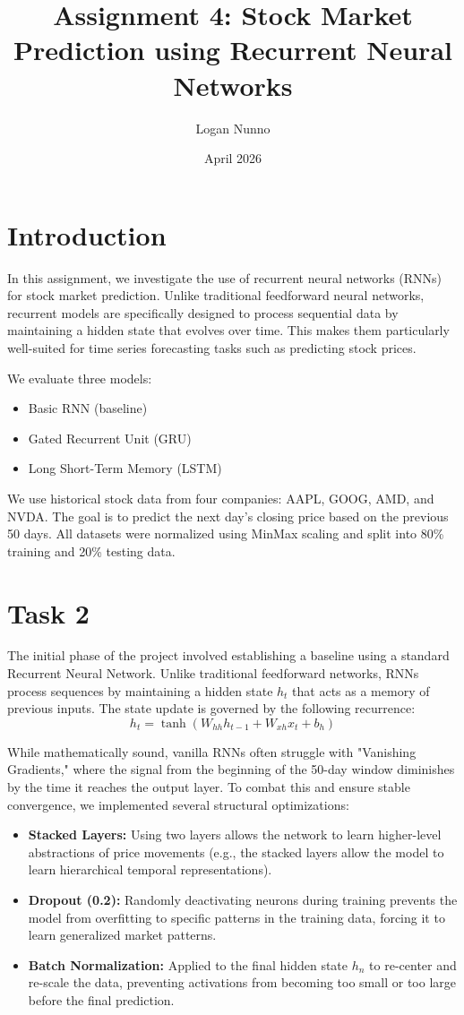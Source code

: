 \documentclass{article}
\title{Assignment 4: Stock Market Prediction using Recurrent Neural
Networks}
\author{Logan Nunno }
\date{April 2026}
\begin{document}
\maketitle

\section{Introduction}

In this assignment, we investigate the use of recurrent neural networks (RNNs) for stock market prediction. Unlike traditional feedforward neural networks, recurrent models are specifically designed to process sequential data by maintaining a hidden state that evolves over time. This makes them particularly well-suited for time series forecasting tasks such as predicting stock prices.

We evaluate three models:
\begin{itemize}
    \item Basic RNN (baseline)
    \item Gated Recurrent Unit (GRU)
    \item Long Short-Term Memory (LSTM)
\end{itemize}

We use historical stock data from four companies: AAPL, GOOG, AMD, and NVDA. The goal is to predict the next day's closing price based on the previous 50 days. All datasets were normalized using MinMax scaling and split into 80\% training and 20\% testing data.


\section{Task 2}

The initial phase of the project involved establishing a baseline using a standard Recurrent Neural Network. Unlike traditional feedforward networks, RNNs process sequences by maintaining a hidden state $h_t$ that acts as a memory of previous inputs. The state update is governed by the following recurrence:
$$
h_t = \tanh(W_{hh}h_{t-1} + W_{xh}x_t + b_h)
$$


While mathematically sound, vanilla RNNs often struggle with "Vanishing Gradients," where the signal from the beginning of the 50-day window diminishes by the time it reaches the output layer. To combat this and ensure stable convergence, we implemented several structural optimizations:
\begin{itemize}
    \item \textbf{Stacked Layers:} Using two layers allows the network to learn higher-level abstractions of price movements (e.g., the stacked layers allow the model to learn hierarchical temporal representations).
    \item \textbf{Dropout (0.2):} Randomly deactivating neurons during training prevents the model from overfitting to specific patterns in the training data, forcing it to learn generalized market patterns.
    \item \textbf{Batch Normalization:} Applied to the final hidden state $h_n$ to re-center and re-scale the data, preventing activations from becoming too small or too large before the final prediction.
\end{itemize}
\end{document}
